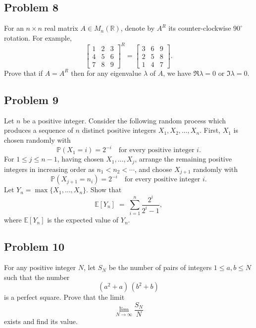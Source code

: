 \documentclass{article}
\begin{document}
    \subsection*{Problem 8}
    For an $n\times n$ real matrix $A\in M_n(\mathbb{R})$, denote by $A^R$ its counter-clockwise $90^\circ$ rotation.  For example,
    \[
        \begin{bmatrix}
            1 & 2 & 3 \\
            4 & 5 & 6 \\
            7 & 8 & 9
        \end{bmatrix}^R
        =
        \begin{bmatrix}
            3 & 6 & 9 \\
            2 & 5 & 8 \\
            1 & 4 & 7
        \end{bmatrix}.
    \]
    Prove that if $A = A^R$ then for any eigenvalue $\lambda$ of $A$, we have $\Re\lambda = 0$ or $\Im\lambda = 0$.

    \subsection*{Problem 9}
    Let $n$ be a positive integer. Consider the following random process which produces a sequence of $n$ distinct positive integers $X_1,X_2,\dots,X_n$. First, $X_1$ is chosen randomly with
    \[
        \mathbb{P}(X_1 = i) = 2^{-i}
        \quad\text{for every positive integer }i.
    \]
    For $1 \le j \le n-1$, having chosen $X_1,\dots,X_j$, arrange the remaining positive integers in increasing order as $n_1 < n_2 < \cdots$, and choose $X_{j+1}$ randomly with
    \[
        \mathbb{P}(X_{j+1} = n_i) = 2^{-i}
        \quad\text{for every positive integer }i.
    \]
    Let $Y_n = \max\{X_1,\dots,X_n\}$. Show that
    \[
        \mathbb{E}[Y_n]
        \;=\;
        \sum_{i=1}^{n}\frac{2^i}{2^i - 1},
    \]
    where $\mathbb{E}[Y_n]$ is the expected value of $Y_n$.

    \subsection*{Problem 10}
    For any positive integer $N$, let $S_N$ be the number of pairs of integers $1 \le a,b \le N$ such that the number
    \[
        (a^2 + a)\,(b^2 + b)
    \]
    is a perfect square. Prove that the limit
    \[
        \lim_{N\to\infty}\frac{S_N}{N}
    \]
    exists and find its value.
\end{document}
